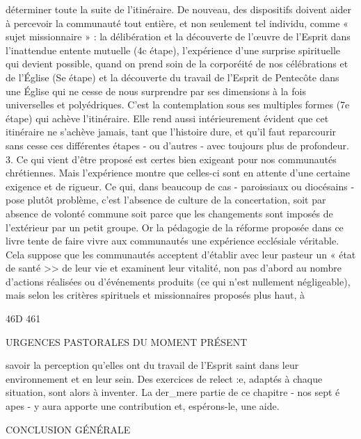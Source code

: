 {déterminer toute la suite de l'itinéraire. De nouveau, des dispositifs doivent aider à percevoir la communauté tout entière, et non seulement tel individu, comme « sujet missionnaire » : la délibération et la découverte de l'œuvre de l'Esprit dans l'inattendue entente mutuelle (4c étape), l'expérience d'une surprise spirituelle qui devient possible, quand on prend soin de la corporéité de nos célébrations et de l'Église (Se étape) et la découverte du travail de l'Esprit de Pentecôte dans une Église qui ne cesse de nous surprendre par ses dimensions à la fois universelles et polyédriques. C'est la contemplation sous ses multiples formes (7e étape) qui achève l'itinéraire. Elle rend aussi intérieurement évident que cet itinéraire ne s'achève jamais, tant que l'histoire dure, et qu'il faut reparcourir sans cesse ces différentes étapes - ou d'autres - avec toujours plus de profondeur.
3.	Ce qui vient d'être proposé est certes bien exigeant pour nos communautés chrétiennes. Mais l'expérience montre que celles-ci sont en attente d'une certaine exigence et de rigueur. Ce qui, dans beaucoup de cas -	paroissiaux ou diocésains - pose plutôt problème, c'est l'absence de culture de la concertation, soit par absence de volonté commune soit parce que les changements sont imposés de l'extérieur par un petit groupe. Or la pédagogie de la réforme proposée dans ce livre tente de faire vivre aux communautés une expérience ecclésiale véritable. Cela suppose que les communautés acceptent d'établir avec leur pasteur un « état de santé >> de leur vie et examinent leur vitalité, non pas d'abord au nombre d'actions réalisées ou d'événements produits (ce qui n'est nullement négligeable), mais selon les critères spirituels et missionnaires proposés plus haut, à
 

46D	461
 
URGENCES PASTORALES DU MOMENT PRÉSENT
 
savoir la perception qu'elles ont du travail de l'Esprit saint dans leur environnement et en leur sein. Des exercices de relect :e, adaptés à chaque situation, sont alors à inventer. La der_mere partie de ce chapitre - nos sept é apes - y aura apporte une contribution et, espérons-le, une aide.
 





CONCLUSION GÉNÉRALE



}
